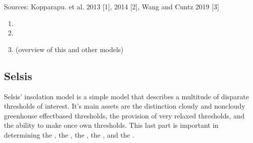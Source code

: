 \documentclass[letterpaper,10pt,english]{sphinxmanual}
\begin{document}
\sphinxAtStartPar
Sources: Kopparapu. et al. 2013 {[}1{]}, 2014 {[}2{]}, Wang and Cuntz 2019 {[}3{]}
\begin{enumerate}
%
\item {} 
\sphinxAtStartPar
{}

\item {} 
\sphinxAtStartPar
{}

\item {} 
\sphinxAtStartPar
{} (overview of this and other models)

\end{enumerate}


\subsection{Selsis}
\label{\detokenize{quantities/insolation_models/selsis/selsis:selsis}}\label{\detokenize{quantities/insolation_models/selsis/selsis::doc}}\label{\detokenize{quantities/insolation_models/selsis/selsis:selsis-insolation-model}}
\sphinxAtStartPar
Selsis’ insolation model is a simple model that describes a multitude of
disparate thresholds of interest.
It’s main assets are the distinction cloudy and non\sphinxhyphen{}cloudy greenhouse effect\sphinxhyphen{}based thresholds,
the provision of very relaxed thresholds, and the ability to make once own thresholds. This last part
is important in determining the {\hyperref[\detokenize{quantities/children_orbit_limits/inner_rock_formation_limit:id1}]{}},
the {\hyperref[\detokenize{quantities/children_orbit_limits/outer_rock_formation_limit:id1}]{}},
the {\hyperref[\detokenize{quantities/children_orbit_limits/inner_water_frost_limit:id1}]{}},
the {\hyperref[\detokenize{quantities/children_orbit_limits/sol_equivalent_water_frost_limit:id1}]{}},
and the {\hyperref[\detokenize{quantities/children_orbit_limits/outer_water_frost_limit:id1}]{}}.
\end{document}
